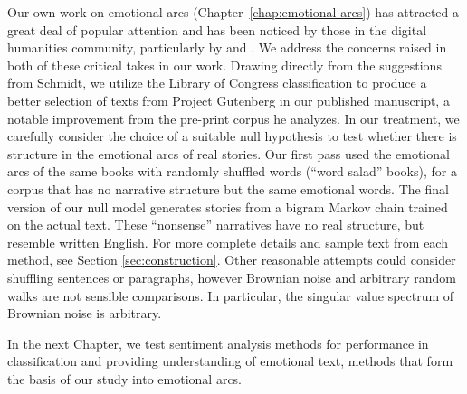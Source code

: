 {Our own work on emotional arcs (Chapter~\ref{chap:emotional-arcs}) has attracted a great deal of popular attention and has been noticed by those in the digital humanities community, particularly by \cite{schmidt2016plot} and \cite{scott2016brownian}.
We address the concerns raised in both of these critical takes in our work.
Drawing directly from the suggestions from Schmidt, we utilize the Library of Congress classification to produce a better selection of texts from Project Gutenberg in our published manuscript, a notable improvement from the pre-print corpus he analyzes.
In our treatment, we carefully consider the choice of a suitable null hypothesis to test whether there is structure in the emotional arcs of real stories.
Our first pass used the emotional arcs of the same books with randomly shuffled words (``word salad'' books), for a corpus that has no narrative structure but the same emotional words.
The final version of our null model generates stories from a bigram Markov chain trained on the actual text.
These ``nonsense'' narratives have no real structure, but resemble written English.
For more complete details and sample text from each method, see Section \ref{sec:construction}.
Other reasonable attempts could consider shuffling sentences or paragraphs, however Brownian noise and arbitrary random walks are not sensible comparisons.
In particular, the singular value spectrum of Brownian noise is arbitrary.

In the next Chapter, we test sentiment analysis methods for performance in classification and providing understanding of emotional text, methods that form the basis of our study into emotional arcs.



}
